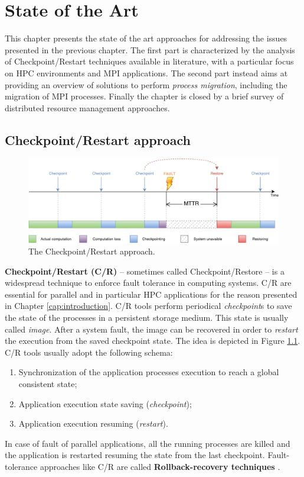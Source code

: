 \chapter{State of the Art}
\label{cap:state-of-the-art}

This chapter presents the state of the art approaches for addressing the
issues presented in the previous chapter. The first part is characterized
by the analysis of Checkpoint/Restart techniques available in literature,
with a particular focus on HPC environments and MPI
applications.
The second part instead aims at providing an overview of solutions to perform
\emph{process migration},
including the migration of MPI processes. Finally the chapter is closed by a
brief survey of distributed resource management approaches.

\section{Checkpoint/Restart approach}
\label{sec:CRApproach}

\begin{figure}[t]
		\centerline 
{\includegraphics[scale=0.55]{img/cap2-cr.pdf}}
		\caption[The Checkpoint/Restart approach]{The Checkpoint/Restart approach.}
		\label{fig:checkpointrestore}
\end{figure}

\textbf{Checkpoint/Restart (C/R)} -- sometimes called Checkpoint/Restore -- is a \linebreak
widespread technique to enforce fault tolerance in computing systems. C/R are
essential for parallel and in particular HPC applications for the reason
presented in Chapter \ref{cap:introduction}.
C/R tools perform periodical \emph{checkpoint}s to save the state of the 
processes in a persistent storage medium. This state is usually called \emph{image}.
After a system fault, the image can be recovered in
order to \emph{restart} the execution from the saved checkpoint state. The
idea is depicted in Figure \ref{fig:checkpointrestore}.
C/R tools usually adopt the following schema:
\begin{enumerate}
\item Synchronization of the application processes execution to
reach a global consistent state;
\item Application execution state saving (\emph{checkpoint}); 
\item Application execution resuming (\emph{restart}).
\end{enumerate}
In case of fault of parallel applications, all the running processes
are killed and the application is restarted resuming the state from the last
checkpoint. Fault-tolerance approaches like C/R are called
\textbf{Rollback-recovery techniques} \cite{elnozahy2002survey}.

